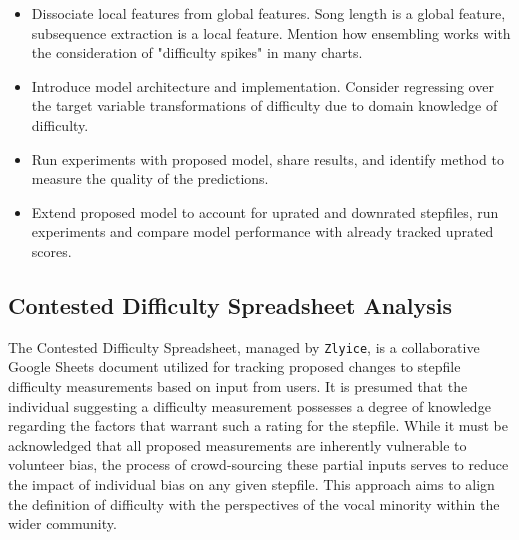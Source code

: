 \begin{itemize}
	\item Dissociate local features from global features. Song length is a global feature, subsequence extraction is a local feature. Mention how ensembling works with the consideration of "difficulty spikes" in many charts.
	      	      
	\item Introduce model architecture and implementation. Consider regressing over the target variable transformations of difficulty due to domain knowledge of difficulty.
	      	      
	\item Run experiments with proposed model, share results, and identify method to measure the quality of the predictions.
	      	      
	\item Extend proposed model to account for uprated and downrated stepfiles, run experiments and compare model performance with already tracked uprated scores.
	      	          
\end{itemize}

\vspace{2mm}



\subsection{Contested Difficulty Spreadsheet Analysis}

The Contested Difficulty Spreadsheet, managed by \texttt{Zlyice}, is a collaborative Google Sheets document utilized for tracking proposed changes to stepfile difficulty measurements based on input from users. It is presumed that the individual suggesting a difficulty measurement possesses a degree of knowledge regarding the factors that warrant such a rating for the stepfile. While it must be acknowledged that all proposed measurements are inherently vulnerable to volunteer bias, the process of crowd-sourcing these partial inputs serves to reduce the impact of individual bias on any given stepfile. This approach aims to align the definition of difficulty with the perspectives of the vocal minority within the wider community.


